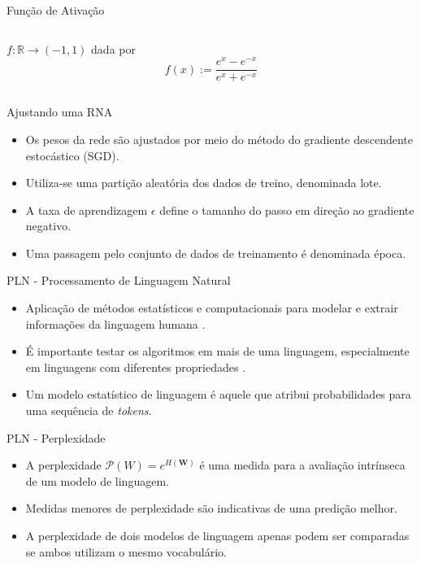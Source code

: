 \documentclass[xcolor=table]{beamer}
\newcommand{\R}{\mathds{R}}
\newcommand{\Perp}{\mathcal{P}}
\newcommand{\bs}[1]{\boldsymbol{#1}}
\begin{document}
\begin{frame}{Função de Ativação}
\begin{columns}[onlytextwidth,t]
\begin{column}{0.48\textwidth}
	            $f:\R \rightarrow (-1,1)$ dada por 
                \[f(x) := \frac{e^{x}-e^{-x}}{e^{x}+e^{-x}}\]
 
            \end{column}
        \end{columns}
    \end{frame}

    \begin{frame}{Ajustando uma RNA}
        \begin{itemize}
            \justifying
            \item Os pesos da rede são ajustados por meio do método do gradiente descendente estocástico (SGD).
            \item Utiliza-se uma partição aleatória dos dados de treino, denominada lote.
            \item A taxa de aprendizagem $\epsilon$ define o tamanho do passo em direção ao gradiente negativo.
            \item Uma passagem pelo conjunto de dados de treinamento é denominada época.
        \end{itemize}
    \end{frame}

    \begin{frame}{PLN - Processamento de Linguagem Natural}
        \begin{itemize}
            \justifying
            \item Aplicação de métodos estatísticos e computacionais para modelar e extrair informações da linguagem humana \citep{kamath2019}.
            \item É importante testar os algoritmos em mais de uma linguagem, especialmente em linguagens com diferentes propriedades \citep{jurafsky2021}.
            \item Um modelo estatístico de linguagem é aquele que atribui probabilidades para uma sequência de \textit{tokens}. 
        \end{itemize}
    \end{frame}

    \begin{frame}{PLN - Perplexidade}
        \begin{itemize}
            \justifying
            \item A perplexidade $\Perp(W)=e^{H(\bs{W})}$ é uma medida para a avaliação intrínseca de um modelo de linguagem.
            \item Medidas menores de perplexidade são indicativas de uma predição melhor.
            \item A perplexidade de dois modelos de linguagem apenas podem ser comparadas se ambos utilizam o mesmo vocabulário.
        \end{itemize}
    \end{frame}
\end{document}
